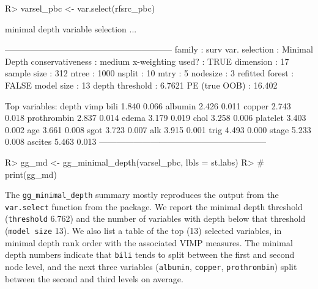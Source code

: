 \documentclass[article, nojss]{jss}
\begin{document}
\begin{Schunk}
\begin{Sinput}
R> varsel_pbc <- var.select(rfsrc_pbc)
\end{Sinput}
\begin{Soutput}
minimal depth variable selection ...


-----------------------------------------------------------
family             : surv
var. selection     : Minimal Depth
conservativeness   : medium
x-weighting used?  : TRUE
dimension          : 17
sample size        : 312
ntree              : 1000
nsplit             : 10
mtry               : 5
nodesize           : 3
refitted forest    : FALSE
model size         : 13
depth threshold    : 6.7621
PE (true OOB)      : 16.402


Top variables:
            depth  vimp
bili        1.840 0.066
albumin     2.426 0.011
copper      2.743 0.018
prothrombin 2.837 0.014
edema       3.179 0.019
chol        3.258 0.006
platelet    3.403 0.002
age         3.661 0.008
sgot        3.723 0.007
alk         3.915 0.001
trig        4.493 0.000
stage       5.233 0.008
ascites     5.463 0.013
-----------------------------------------------------------
\end{Soutput}
\begin{Sinput}
R> gg_md <- gg_minimal_depth(varsel_pbc, lbls = st.labs)
R> # print(gg_md)
\end{Sinput}
\end{Schunk}

The \texttt{gg\_minimal\_depth} summary mostly reproduces the output
from the \texttt{var.select} function from the 
package. We report the minimal depth threshold (\texttt{threshold}
6.762) and the number of variables with depth below that threshold
(\texttt{model\ size} 13). We also list a table of the top (13) selected
variables, in minimal depth rank order with the associated VIMP
measures. The minimal depth numbers indicate that \texttt{bili} tends to
split between the first and second node level, and the next three
variables (\texttt{albumin}, \texttt{copper}, \texttt{prothrombin})
split between the second and third levels on average.
\end{document}
